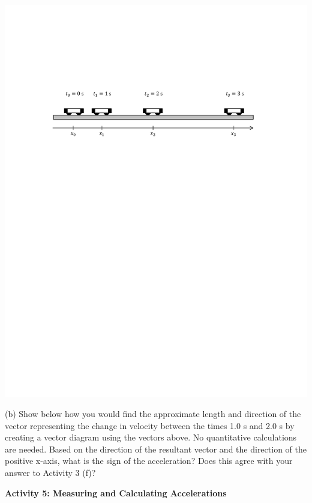\vspace{0.3cm}
{\par\centering \includegraphics{changing/carts_const_a.pdf} \par}
\vspace{0.3cm}

(b) Show below how you would find the approximate length and direction of the
vector representing the change in velocity between the times 1.0 s and 2.0 s
by creating a vector diagram using the vectors above. No quantitative 
calculations are needed. Based on the direction of the resultant vector and 
the direction of the positive x-axis, what is the sign of the acceleration? 
Does this agree with your answer to Activity 3 (f)?
\answerspace{20mm}

\textbf{Activity 5: Measuring and Calculating Accelerations}

